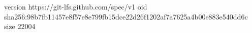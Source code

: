version https://git-lfs.github.com/spec/v1
oid sha256:98b7fb11457e8f57e8e799fb15dce22d26f1202af7a7625a4b00e883e540dd6c
size 22004
